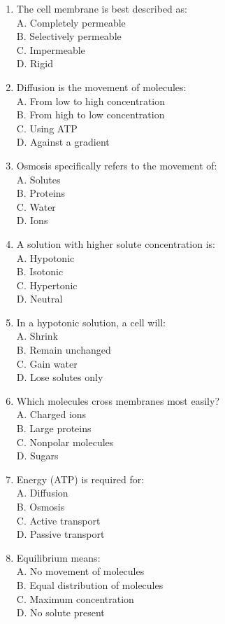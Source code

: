 \documentclass[
  letterpaper,
  DIV=11,
  numbers=noendperiod]{scrreprt}
\begin{document}
\begin{enumerate}
\def\labelenumi{\arabic{enumi}.}
\item
  The cell membrane is best described as:\\
  A. Completely permeable\\
  B. Selectively permeable\\
  C. Impermeable\\
  D. Rigid
\item
  Diffusion is the movement of molecules:\\
  A. From low to high concentration\\
  B. From high to low concentration\\
  C. Using ATP\\
  D. Against a gradient
\item
  Osmosis specifically refers to the movement of:\\
  A. Solutes\\
  B. Proteins\\
  C. Water\\
  D. Ions
\item
  A solution with higher solute concentration is:\\
  A. Hypotonic\\
  B. Isotonic\\
  C. Hypertonic\\
  D. Neutral
\item
  In a hypotonic solution, a cell will:\\
  A. Shrink\\
  B. Remain unchanged\\
  C. Gain water\\
  D. Lose solutes only
\item
  Which molecules cross membranes most easily?\\
  A. Charged ions\\
  B. Large proteins\\
  C. Nonpolar molecules\\
  D. Sugars
\item
  Energy (ATP) is required for:\\
  A. Diffusion\\
  B. Osmosis\\
  C. Active transport\\
  D. Passive transport
\item
  Equilibrium means:\\
  A. No movement of molecules\\
  B. Equal distribution of molecules\\
  C. Maximum concentration\\
  D. No solute present
\end{enumerate}
\end{document}
